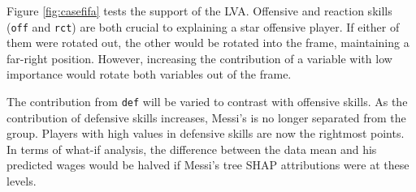 \documentclass[
]{sn-jnl}
\begin{document}
Figure \ref{fig:casefifa} tests the support of the LVA. Offensive and
reaction skills (\texttt{off} and \texttt{rct}) are both crucial to
explaining a star offensive player. If either of them were rotated out,
the other would be rotated into the frame, maintaining a far-right
position. However, increasing the contribution of a variable with low
importance would rotate both variables out of the frame.

The contribution from \texttt{def} will be varied to contrast with
offensive skills. As the contribution of defensive skills increases,
Messi's is no longer separated from the group. Players with high values
in defensive skills are now the rightmost points. In terms of what-if
analysis, the difference between the data mean and his predicted wages
would be halved if Messi's tree SHAP attributions were at these levels.
\end{document}
